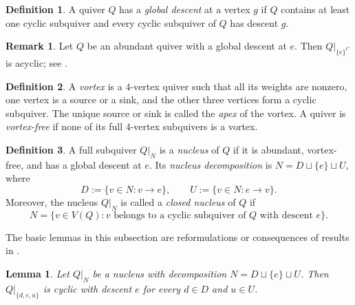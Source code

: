 \documentclass[10pt,a4paper]{amsart}
\newtheorem{lemma}[lemma]{Lemma}
\theoremstyle{definition}
\newtheorem{definition}[definition]{Definition}
\theoremstyle{definition}
\newtheorem{remark}[remark]{Remark}
\numberwithin{equation}{section}
\numberwithin{table}{section}
\begin{document}
\begin{definition}\label{def:global-descent}
A quiver $Q$ has a \emph{global descent} at a vertex $g$ if
$Q$ contains at least one cyclic subquiver and every cyclic subquiver of $Q$
has descent $g$.
\end{definition}

\begin{remark}\label{rem:delete-global-descent}
Let $Q$ be an abundant quiver with a global descent at $e$. Then
$Q|_{\{e\}^C}$ is acyclic; see \cite[Lemma~6.5]{FN25}.
\end{remark}

\begin{definition}\label{def:vortex}
A \emph{vortex} is a $4$-vertex quiver such that all its weights are
nonzero, one vertex is a source or a sink, and the other three vertices
form a cyclic subquiver. The unique source or sink is called the \emph{apex}
of the vortex. A quiver is \emph{vortex-free} if none of its full $4$-vertex
subquivers is a vortex.
\end{definition}

\begin{definition}\label{def:nucleus}
A full subquiver $Q|_N$ is a \emph{nucleus} of $Q$ if it is abundant,
vortex-free, and has a global descent at $e$. Its \emph{nucleus decomposition} is
$N=D\sqcup\{e\}\sqcup U$, where
\[
D:=\{v\in N:v\longrightarrow e\},\qquad U:=\{v\in N:e\longrightarrow v\}.
\]
Moreover, the nucleus $Q|_N$ is called a \emph{closed nucleus} of $Q$ if
\[
 N=\{v\in V(Q):v\text{ belongs to a cyclic subquiver of }Q
 \text{ with descent }e\}.
\]
\end{definition}

The basic lemmas in this subsection are reformulations or consequences of
results in \cite[Section~6]{FN25}.

\begin{lemma}\label{lem:global-descent-structure}
Let $Q|_N$ be a nucleus with decomposition $N=D\sqcup\{e\}\sqcup U$. Then $Q|_{\{d,e,u\}}$ is cyclic with descent $e$
for every $d\in D$ and $u\in U$.
\end{lemma}
\end{document}
